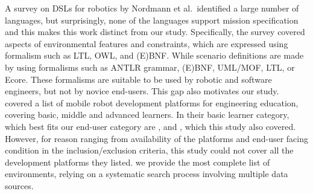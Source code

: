 A survey on DSLs for robotics by Nordmann et al.\,\cite{Nordmann2016a} identified a large number of languages, but surprisingly, none of the languages support mission specification and this makes this work distinct from our study.
Specifically, the survey covered aspects of environmental features and constraints, which are expressed using formalism such as LTL, OWL, and (E)BNF. While scenario definitions are made by using formalisms such as ANTLR grammar, (E)BNF, UML/MOF, LTL, or Ecore. These formalisms are suitable to be used by robotic and software engineers, but not by novice end-users. This gap also motivates our study.
\citet{bacca.ea:2017:teachingrobots} covered a list of mobile robot development platforms for engineering education, covering basic, middle and advanced learners. In their basic learner category, which best fits our end-user category are \aseba, and \edison, which this study also covered. However, for reason ranging from availability of the platforms and end-user facing condition in the inclusion/exclusion criteria, this study could not cover all the development platforms they listed. we provide the most complete list of environments, relying on a systematic search process involving multiple data sources.  %


